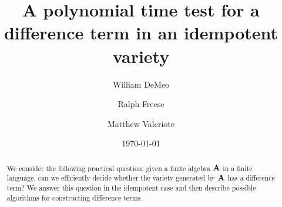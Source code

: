 \usepackage[mathcal]{euscript}


\renewcommand{\th}[2]{#1\mathrel{\theta}#2}
\newcommand{\infixrel}[3]{#2\mathrel{#1}#3}



\newtheorem{theorem}{Theorem}
\newtheorem{lemma}[theorem]{Lemma}
\newtheorem{corollary}[theorem]{Corollary}
\newtheorem{prop}[theorem]{Proposition}
\newtheorem{example}[theorem]{Example}
\newtheorem{conjecture}[theorem]{Conjecture}
\newtheorem{fact}[theorem]{Fact}
\newtheorem{prob}{Problem}

\title[A test for a difference term]{A polynomial time test for a
difference term in an idempotent variety}
\author[DeMeo]{William DeMeo}
\address[William DeMeo]{
Department of Mathematics\\
University of Hawaii\\
Honolulu, Hawaii\\
96822 USA}
\author[Freese]{Ralph Freese}
\address[Ralph Freese]{
Department of Mathematics\\
University of Hawaii\\
Honolulu, Hawaii\\
96822 USA}
\author[Valeriote]{Matthew Valeriote}
\address[Matthew Valeriote]{
Department of Mathematics\\
McMaster University\\
Hamilton, Ontario\\
xxxxx Canada}

\date{\today}



\maketitle 

\begin{abstract}
We consider the following practical question: given a finite 
algebra $\mathbf{A}$ in a
finite language, can we efficiently decide whether the variety 
generated by $\mathbf{A}$
has a difference term?  We answer this question in the idempotent case
and then describe possible algorithms for constructing difference terms.
\end{abstract}

